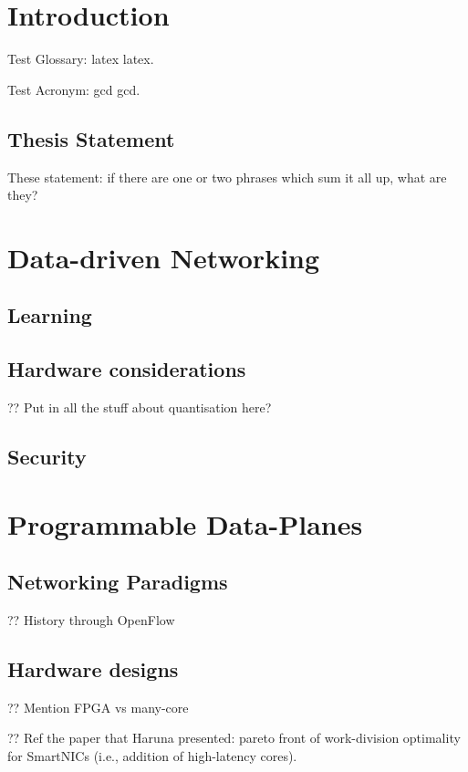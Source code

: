 \chapter{Introduction}

Test Glossary: \Gls{latex} \gls{latex}.

Test Acronym: \acrlong{gcd} \acrshort{gcd}.

\section{Thesis Statement}

These statement: if there are one or two phrases which sum it all up, what are they?

\chapter{Data-driven Networking}

\section{Learning}

\section{Hardware considerations}

?? Put in all the stuff about quantisation here?

\section{Security}

\chapter{Programmable Data-Planes}

\section{Networking Paradigms}

?? History through OpenFlow

\section{Hardware designs}

?? Mention FPGA vs many-core

?? Ref the paper that Haruna presented: pareto front of work-division optimality for SmartNICs (i.e., addition of high-latency cores).